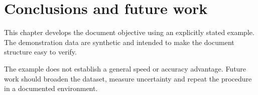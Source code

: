 \chapter{Conclusions and future work}


\label{sec:chapter5}
This chapter develops the document objective using an explicitly stated example. The demonstration data are synthetic and intended to make the document structure easy to verify.

The example does not establish a general speed or accuracy advantage. Future work should broaden the dataset, measure uncertainty and repeat the procedure in a documented environment.
